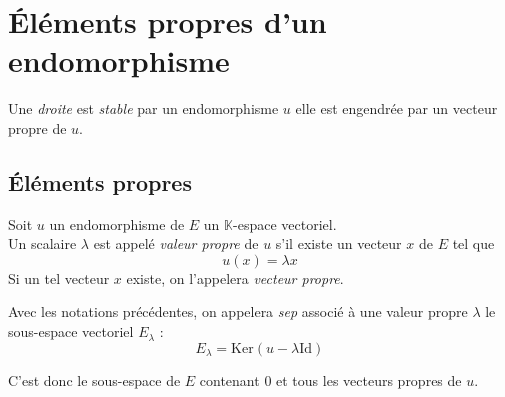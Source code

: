 \documentclass[11pt,a4paper,fleqn,pdftex]{report}
\begin{document}
\section{Éléments propres d'un endomorphisme} %
\label{sec:elements_propres_d_un_endomorphisme}
\begin{theorem}
     Une \emph{droite} est \emph{stable} par un endomorphisme $u$  elle est engendrée par un vecteur propre de $u$.
\end{theorem}
\subsection{Éléments propres}
\begin{dfn}
     Soit $u$ un endomorphisme de $E$ un $\mathbb{K}$-espace vectoriel.\\ 
     Un scalaire $\lambda$ est appelé \emph{valeur propre} de $u$ s'il existe un vecteur $x$  de $E$ tel que 
     \begin{equation}
     u(x) = \lambda x
     \end{equation}
     Si un tel vecteur $x$ existe, on l'appelera \emph{vecteur propre}.
\end{dfn}
\begin{dfn}
\label{dfn:sous-espace_propre}
     Avec les notations précédentes, on appelera \emph{\acrfull{sep}} associé à une valeur propre $\lambda$ le sous-espace vectoriel $E_\lambda$ : 
     \begin{equation}
     E_\lambda = \mathrm{Ker} \left( u - \lambda \mathrm{Id} \right) 
     \end{equation}

     C'est donc le sous-espace de $E$ contenant $0$ et tous les vecteurs propres de $u$.
\end{dfn}
\end{document}
